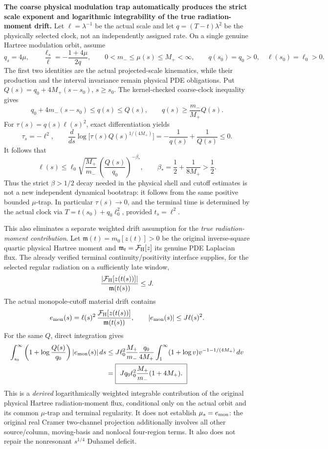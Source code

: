 \documentclass[11pt]{amsart}
\begin{document}
\medskip
\noindent\textbf{The coarse physical modulation trap automatically produces
the strict scale exponent and logarithmic integrability of the true
radiation-moment drift.}
Let \(\ell=\lambda^{-1}\) be the actual scale and let
\(q=(T-t)\lambda^2\) be the physically selected clock,
not an independently assigned rate.
On a single genuine Hartree modulation orbit, assume
\[
 q_s=4\mu,\qquad
 \frac{\ell_s}{\ell}=-\frac{1+4\mu}{2q},\qquad
 0<m_-\le\mu(s)\le M_+<\infty,\qquad
 q(s_0)=q_0>0,\quad \ell(s_0)=\ell_0>0.
\]
The first two identities are the actual projected-scale
kinematics, while their production and the interval
invariance remain physical PDE obligations.
Put \(Q(s)=q_0+4M_+(s-s_0)\), \(s\ge s_0\).
The kernel-checked coarse-clock inequality gives
\[
 q_0+4m_-(s-s_0)\le q(s)\le Q(s),
 \qquad q(s)\ge\frac{m_-}{M_+}Q(s).
\]
For \(\tau(s)=q(s)\ell(s)^2\), exact differentiation yields
\[
 \tau_s=-\ell^2,\qquad
 \frac{d}{ds}\log\bigl[
   \tau(s)Q(s)^{1/(4M_+)}
 \bigr]
 =-\frac1{q(s)}+\frac1{Q(s)}\le0.
\]
It follows that
\[
 \boxed{\quad
 \ell(s)\le\ell_0\sqrt{\frac{M_+}{m_-}}\,
    \left(\frac{Q(s)}{q_0}\right)^{
      -\beta_*},\qquad
 \beta_*=\frac12+\frac1{8M_+}>\frac12.
 \quad}
\]
Thus the strict \(\beta>1/2\) decay needed in the
physical shell and cutoff estimates is not a new
independent dynamical bootstrap: it follows from
the same positive bounded \(\mu\)-trap. In particular
\(\tau(s)\to0\), and the terminal time is determined
by the actual clock via
\(T=t(s_0)+q_0\ell_0^2\), provided \(t_s=\ell^2\).

This also eliminates a separate weighted drift
assumption for the \emph{true radiation-moment
contribution}. Let
\(\mathfrak m(t)=m_0[z(t)]>0\) be the original
inverse-square quartic physical Hartree moment and
\(\mathfrak m_t=\mathcal F_{\rm H}[z]\) its genuine
PDE Laplacian flux. The already verified terminal
continuity/positivity interface supplies, for
the selected regular radiation on a sufficiently
late window,
\[
 \frac{|\mathcal F_{\rm H}[z(t(s))]|}
      {\mathfrak m(t(s))}\le J.
\]
The actual monopole-cutoff material drift contains
\[
 e_{\rm mon}(s)=\ell(s)^2\,
   \frac{\mathcal F_{\rm H}[z(t(s))]}
        {\mathfrak m(t(s))},\qquad
 |e_{\rm mon}(s)|\le J\ell(s)^2.
\]
For the same \(Q\), direct integration gives
\[
 \begin{aligned}
 \int_{s_0}^{\infty}
 \left(1+\log\frac{Q(s)}{q_0}\right)
 |e_{\rm mon}(s)|\,ds
 &\le J\ell_0^2\frac{M_+}{m_-}
 \frac{q_0}{4M_+}
 \int_1^{\infty}(1+\log v)
     v^{-1-1/(4M_+)}\,dv\\
 &=\boxed{\
 Jq_0\ell_0^2\frac{M_+}{m_-}(1+4M_+).\ }
 \end{aligned}
\]
This is a \emph{derived} logarithmically weighted
integrable contribution of the original physical
Hartree radiation-moment flux, conditional only on
the actual orbit and its common \(\mu\)-trap and
terminal regularity. It does not establish
\(\mu_s=e_{\rm mon}\): the original real Cramer
two-channel projection additionally involves all
other source/column, moving-basis and nonlocal
four-region terms. It also does not repair the
nonresonant \(s^{1/4}\) Duhamel deficit.
\end{document}
